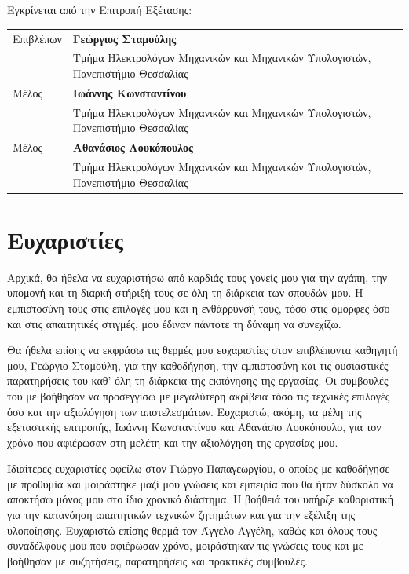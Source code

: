 \documentclass[12pt,a4paper,twoside,fleqn]{book}
\newcommand{\SupervisorGreek}{Γεώργιος Σταμούλης}
\newcommand{\CommitteeOneGreek}{Ιωάννης Κωνσταντίνου}
\newcommand{\CommitteeTwoGreek}{Αθανάσιος Λουκόπουλος}
\newcommand{\blankpage}{%
  \clearpage
  \thispagestyle{empty}
  \null
  \clearpage
}
\begin{document}
\blankpage

\chapter*{}
\thispagestyle{plain}
\vspace*{2cm}
\noindent Εγκρίνεται από την Επιτροπή Εξέτασης:

\vspace{1.4cm}
{\footnotesize
\noindent
\begin{tabularx}{\textwidth}{@{}p{1.8cm}>{\raggedright\arraybackslash}X@{}}
Επιβλέπων & \textbf{\SupervisorGreek}\\
           & Τμήμα Ηλεκτρολόγων Μηχανικών και Μηχανικών Υπολογιστών, Πανεπιστήμιο Θεσσαλίας\\[0.9cm]
Μέλος     & \textbf{\CommitteeOneGreek}\\
           & Τμήμα Ηλεκτρολόγων Μηχανικών και Μηχανικών Υπολογιστών, Πανεπιστήμιο Θεσσαλίας\\[0.9cm]
Μέλος     & \textbf{\CommitteeTwoGreek}\\
           & Τμήμα Ηλεκτρολόγων Μηχανικών και Μηχανικών Υπολογιστών, Πανεπιστήμιο Θεσσαλίας
\end{tabularx}
}

\blankpage

\chapter*{Ευχαριστίες}
Αρχικά, θα ήθελα να ευχαριστήσω από καρδιάς τους γονείς μου για την αγάπη,
την υπομονή και τη διαρκή στήριξή τους σε όλη τη διάρκεια των σπουδών μου.
Η εμπιστοσύνη τους στις επιλογές μου και η ενθάρρυνσή τους, τόσο στις όμορφες
όσο και στις απαιτητικές στιγμές, μου έδιναν πάντοτε τη δύναμη να συνεχίζω.

Θα ήθελα επίσης να εκφράσω τις θερμές μου ευχαριστίες στον επιβλέποντα
καθηγητή μου, Γεώργιο Σταμούλη, για την καθοδήγηση, την εμπιστοσύνη και τις
ουσιαστικές παρατηρήσεις του καθ’ όλη τη διάρκεια της εκπόνησης της
εργασίας. Οι συμβουλές του με βοήθησαν να προσεγγίσω με μεγαλύτερη ακρίβεια
τόσο τις τεχνικές επιλογές όσο και την αξιολόγηση των αποτελεσμάτων.
Ευχαριστώ, ακόμη, τα μέλη της εξεταστικής επιτροπής, Ιωάννη Κωνσταντίνου και
Αθανάσιο Λουκόπουλο, για τον χρόνο που αφιέρωσαν στη μελέτη και την
αξιολόγηση της εργασίας μου.

Ιδιαίτερες ευχαριστίες οφείλω στον Γιώργο Παπαγεωργίου, ο οποίος με
καθοδήγησε με προθυμία και μοιράστηκε μαζί μου γνώσεις και εμπειρία που θα
ήταν δύσκολο να αποκτήσω μόνος μου στο ίδιο χρονικό διάστημα. Η βοήθειά του
υπήρξε καθοριστική για την κατανόηση απαιτητικών τεχνικών ζητημάτων και για
την εξέλιξη της υλοποίησης. Ευχαριστώ επίσης θερμά τον Άγγελο Αγγέλη, καθώς
και όλους τους συναδέλφους μου που αφιέρωσαν χρόνο, μοιράστηκαν τις γνώσεις
τους και με βοήθησαν με συζητήσεις, παρατηρήσεις και πρακτικές συμβουλές.
\end{document}
